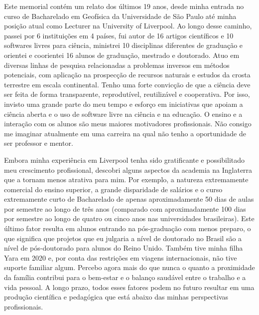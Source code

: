 \documentclass[10pt,a4paper,oneside]{book}
\begin{document}
Este memorial contém um relato dos últimos 19 anos, desde minha entrada no
curso de Bacharelado em Geofísica da Universidade de São Paulo até minha
posição atual como Lecturer na University of Liverpool.
Ao longo desse caminho, passei por 6 instituições em 4 países, fui autor de 16
artigos científicos e 10 softwares livres para ciência, ministrei 10
disciplinas diferentes de graduação e orientei e coorientei 16 alunos de
graduação, mestrado e doutorado.
Atuo em diversas linhas de pesquisa relacionadas a problemas inversos em
métodos potenciais, com aplicação na prospecção de recursos naturais e estudos
da crosta terrestre em escala continental.
Tenho uma forte convicção de que a ciência deve ser feita de forma
transparente, reprodutível, reutilizável e cooperativa.
Por isso, invisto uma grande parte do meu tempo e esforço em iniciativas que
apoiam a ciência aberta e o uso de software livre na ciência e na educação.
O ensino e a interação com os alunos são meus maiores motivadores
profissionais.
Não consigo me imaginar atualmente em uma carreira na qual não tenho a
oportunidade de ser professor e mentor.

Embora minha experiência em Liverpool tenha sido gratificante e possibilitado
meu crescimento profissional, descobri alguns aspectos da academia na
Inglaterra que a tornam menos atrativa para mim.
Por exemplo, a natureza extremamente comercial do ensino superior, a grande
disparidade de salários e o curso extremamente curto de Bacharelado de apenas
aproximadamente 50 dias de aulas por semestre ao longo de três anos (comparado
com aproximadamente 100 dias por semestre ao longo de quatro ou cinco anos nas
universidades brasileiras).
Este último fator resulta em alunos entrando na pós-graduação com menos
preparo, o que significa que projetos que eu julgaria a nível de doutorado no
Brasil são a nível de pós-doutorado para alunos do Reino Unido.
Também tive minha filha Yara em 2020 e, por conta das restrições em viagens
internacionais, não tive suporte familiar algum.
Percebo agora mais do que nunca o quanto a proximidade da família contribui
para o bem-estar e o balanço saudável entre o trabalho e a vida pessoal.
A longo prazo, todos esses fatores podem no futuro resultar em uma produção
científica e pedagógica que está abaixo das minhas perspectivas profissionais.
\end{document}
